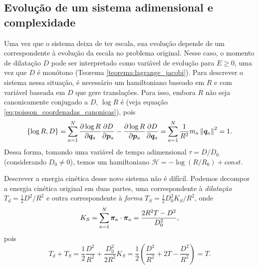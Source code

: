 
\subsection{Evolução de um sistema adimensional e complexidade}
Uma vez que o sistema deixa de ter escala, sua evolução depende de um correspondente à evolução da escala no problema original. Nesse caso, o momento de dilatação $D$ pode ser interpretado como variável de evolução para $E \geq 0$, uma vez que $D$ é monótono (Teorema \ref{teorema:lagrange_jacobi}). Para descrever o sistema nessa situação, é necessário um hamiltoniano baseado em $R$ e com variável baseada em $D$ que gere translações. Para isso, embora $R$ não seja canonicamente conjugado a $D$, $\log R$ é (veja equação \ref{eq:poisson_coordenadas_canonicas}), pois
\begin{equation*}
    \{\log R, D \} 
    = \sum_{a=1}^{N} \dfrac{\partial \log R}{\partial \bm q_a} \dfrac{\partial D}{\partial \bm p_a} - \dfrac{\partial \log R}{\partial \bm p_a} \dfrac{\partial D}{\partial \bm q_a}
    = \sum_{a=1}^{N} \dfrac{1}{R^2} m_a \left\Vert \bm q_a \right\Vert^2 
    = 1.
\end{equation*}
Dessa forma, tomando uma variável de tempo adimensional $\tau = D/D_0$ (considerando $D_0 \neq 0$), temos um hamiltoniano $\mathcal H = - \log{(R/R_0)} + const$.

Descrever a energia cinética desse novo sistema não é difícil. Podemos decompor a energia cinética original em duas partes, uma correspondente à \textit{dilatação} $T_d = \frac{1}{2} D^2 / R^2$ e outra correspondente à \textit{forma} $T_S = \frac{1}{2} D_0^2 K_S / R^2$, onde
\begin{equation*}
    K_S = \sum_{a=1}^{N} \bm \pi_a \cdot \bm \pi_a = \dfrac{2 R^2 T - D^2}{D_0^2},
\end{equation*}
pois
\begin{equation*}
    T_d + T_S
    = \dfrac{1}{2} \dfrac{D^2}{R^2} + \dfrac{D_0^2}{2 R^2} K_S
    = \dfrac{1}{2} \left( \dfrac{D^2}{R^2} + 2 T - \dfrac{D^2}{R^2} \right) = T.
\end{equation*}


